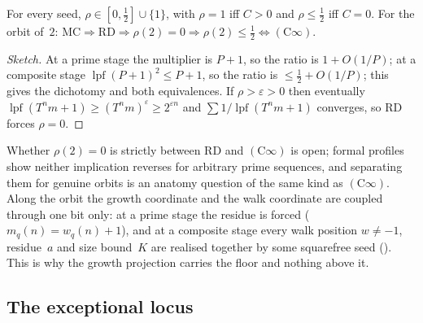 \documentclass[10pt,a4paper]{article}
\newcommand{\lpf}{\operatorname{lpf}}
\newcommand{\RD}{\mathrm{RD}}
\newcommand{\Cinf}{(\mathrm{C}\infty)}
\begin{document}
\begin{theorem}
For every seed, $\rho\in[0,\tfrac12]\cup\{1\}$, with $\rho=1$ iff $C>0$
and $\rho\le\tfrac12$ iff $C=0$.  For the orbit of~$2$:
$\mathrm{MC}\Rightarrow\RD\Rightarrow\rho(2)=0\Rightarrow\rho(2)\le\tfrac12
\Leftrightarrow\Cinf$.
\end{theorem}

\begin{proof}[Sketch]
At a prime stage the multiplier is $P+1$, so the ratio is $1+O(1/P)$; at a
composite stage $\lpf(P+1)^2\le P+1$, so the ratio is $\le\tfrac12+O(1/P)$;
this gives the dichotomy and both equivalences.  If $\rho>\varepsilon>0$
then eventually $\lpf(T^{n}m+1)\ge(T^{n}m)^{\varepsilon}\ge2^{\varepsilon n}$ and
$\sum1/\lpf(T^{n}m+1)$ converges, so RD forces $\rho=0$.
\end{proof}

Whether $\rho(2)=0$ is strictly between RD and $\Cinf$ is open; formal
profiles show neither implication reverses for arbitrary prime sequences,
and separating them for genuine orbits is an anatomy question of the same
kind as $\Cinf$.  Along the orbit the growth coordinate and the walk
coordinate are coupled through one bit only: at a prime stage the residue
is forced ($m_q(n)=w_q(n)+1$), and at a composite stage every walk position
$w\ne-1$, residue~$a$ and size bound~$K$ are realised together by some
squarefree seed
().
This is why the growth projection carries the floor and nothing above it.


\subsection{The exceptional locus}
\end{document}
